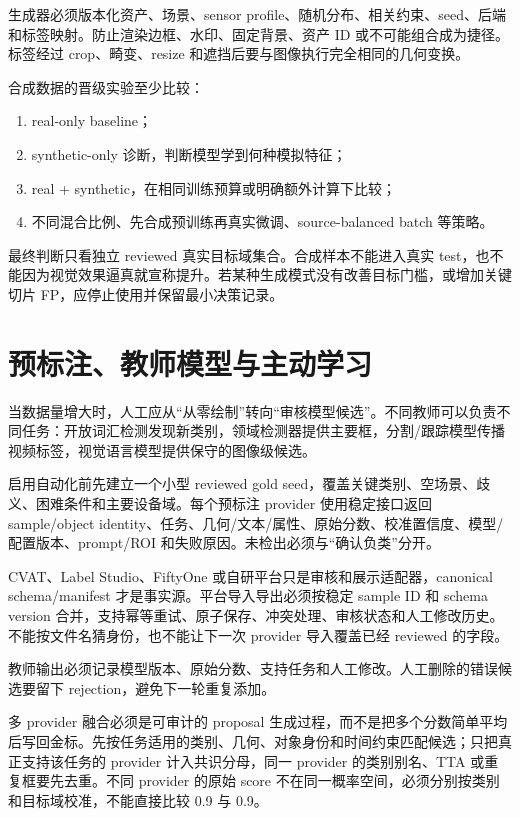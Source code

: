 生成器必须版本化资产、场景、sensor profile、随机分布、相关约束、seed、后端和标签映射。防止渲染边框、水印、固定背景、资产 ID 或不可能组合成为捷径。标签经过 crop、畸变、resize 和遮挡后要与图像执行完全相同的几何变换。

合成数据的晋级实验至少比较：

\begin{enumerate}
  \item real-only baseline；
  \item synthetic-only 诊断，判断模型学到何种模拟特征；
  \item real + synthetic，在相同训练预算或明确额外计算下比较；
  \item 不同混合比例、先合成预训练再真实微调、source-balanced batch 等策略。
\end{enumerate}

最终判断只看独立 reviewed 真实目标域集合。合成样本不能进入真实 test，也不能因为视觉效果逼真就宣称提升。若某种生成模式没有改善目标门槛，或增加关键切片 FP，应停止使用并保留最小决策记录。

\section{预标注、教师模型与主动学习}

当数据量增大时，人工应从“从零绘制”转向“审核模型候选”。不同教师可以负责不同任务：开放词汇检测发现新类别，领域检测器提供主要框，分割/跟踪模型传播视频标签，视觉语言模型提供保守的图像级候选。

启用自动化前先建立一个小型 reviewed gold seed，覆盖关键类别、空场景、歧义、困难条件和主要设备域。每个预标注 provider 使用稳定接口返回 sample/object identity、任务、几何/文本/属性、原始分数、校准置信度、模型/配置版本、prompt/ROI 和失败原因。未检出必须与“确认负类”分开。

CVAT、Label Studio、FiftyOne 或自研平台只是审核和展示适配器，canonical schema/manifest 才是事实源。平台导入导出必须按稳定 sample ID 和 schema version 合并，支持幂等重试、原子保存、冲突处理、审核状态和人工修改历史。不能按文件名猜身份，也不能让下一次 provider 导入覆盖已经 reviewed 的字段。

教师输出必须记录模型版本、原始分数、支持任务和人工修改。人工删除的错误候选要留下 rejection，避免下一轮重复添加。

多 provider 融合必须是可审计的 proposal 生成过程，而不是把多个分数简单平均后写回金标。先按任务适用的类别、几何、对象身份和时间约束匹配候选；只把真正支持该任务的 provider 计入共识分母，同一 provider 的类别别名、TTA 或重复框要先去重。不同 provider 的原始 score 不在同一概率空间，必须分别按类别和目标域校准，不能直接比较 0.9 与 0.9。

